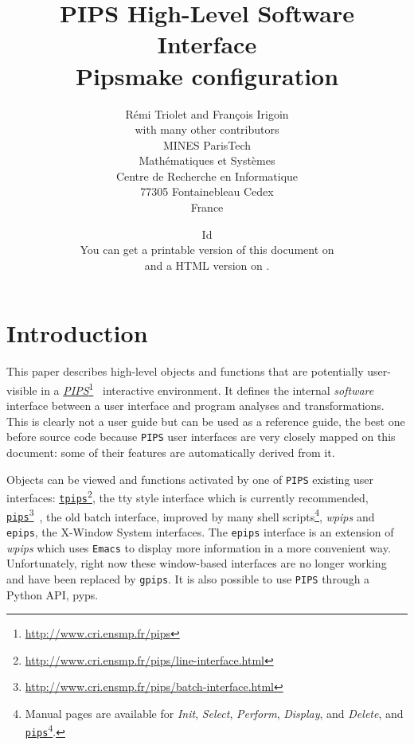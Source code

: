 \documentclass[a4paper]{report}
\title{PIPS High-Level Software Interface \\
    Pipsmake configuration}
\author{R\'emi Triolet and Fran\c{c}ois Irigoin\\
  with many other contributors\\
        MINES ParisTech \\
        Math\'ematiques et Syst\`emes \\
        Centre de Recherche en Informatique \\
        77305 Fontainebleau Cedex \\
        France \\}
\date{
  $~$Id$~$\\[3cm]
  You can get a printable version of this document on\\
  \PipsPIPSmakePDF and a HTML version on \PipsPIPSmakeHTDOC.
}
\newenvironment{PipsExample}{\VerbatimEnvironment
\begin{Verbatim}}{\end{Verbatim}}
\newcommand{\LINK}[2]{\href{#2}{#1}\footnote{\url{#2}}\xspace}
\newcommand{\Pips}{\texttt{PIPS}}
\newcommand{\PIPS}{\LINK{\emph{PIPS}}{http://www.cri.ensmp.fr/pips}}
\newcommand{\pips}{\LINK{\texttt{pips}}{http://www.cri.ensmp.fr/pips/batch-interface.html}}
\newcommand{\TPIPS}{\LINK{\texttt{tpips}}{http://www.cri.ensmp.fr/pips/line-interface.html}}
\newcommand{\WPIPS}{{\em wpips}}
\newcommand{\Init}{{\em Init}}
\newcommand{\Select}{{\em Select}}
\newcommand{\Perform}{{\em Perform}}
\newcommand{\Display}{{\em Display}}
\newcommand{\Delete}{{\em Delete}}
\begin{document}
\thispagestyle{empty}

\maketitle



\newenvironment{PipsMenu}[1]{\par{\bf #1}\\\begin{alltt}}{\end{alltt}}



\chapter{Introduction}

This paper describes high-level objects and functions that are
potentially user-visible in a \PIPS{}~\cite{IJT91} interactive
environment.  It defines the internal {\em software} interface between
a user interface and program analyses and transformations. This is
clearly not a user guide but can be used as a reference guide, the
best one before source code because {\tt PIPS} user interfaces are very
closely mapped on this document: some of their features are
automatically derived from it.

Objects can be viewed and functions activated by one of \Pips{}
existing user interfaces: \TPIPS{}, the tty style interface which is
currently recommended, \pips{}~\cite{BIJ91}, the old batch
interface, improved by many shell scripts\footnote{Manual pages are
  available for \Init{}, \Select{}, \Perform{}, \Display{}, and
  \Delete{}, and \pips{}.}, \WPIPS{} and {\tt epips}, the X-Window
System interfaces.  The {\tt epips} interface is an extension of
\WPIPS{} which uses {\tt Emacs} to display more information in a more
convenient way. Unfortunately, right now these window-based interfaces
are no longer working and have been replaced by {\tt gpips}. It is
also possible to use \Pips{} through a Python API, pyps.
\end{document}
